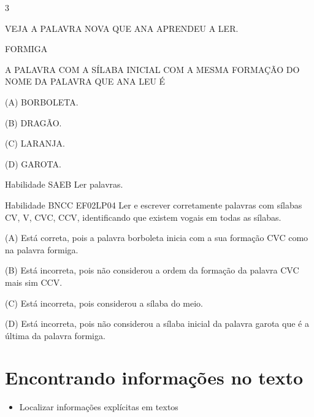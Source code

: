 {{\num{3}

VEJA A PALAVRA NOVA QUE ANA APRENDEU A LER.

FORMIGA

A PALAVRA COM A SÍLABA INICIAL COM A MESMA FORMAÇÃO DO NOME DA PALAVRA
QUE ANA LEU É

(A) BORBOLETA.

(B) DRAGÃO.

(C) LARANJA.

(D) GAROTA.

Habilidade SAEB Ler palavras.

Habilidade BNCC EF02LP04 Ler e escrever corretamente palavras com
sílabas CV, V, CVC, CCV, identificando que existem vogais em todas as
sílabas.

(A) Está correta, pois a palavra borboleta inicia com a sua formação CVC
como na palavra formiga.

(B) Está incorreta, pois não considerou a ordem da formação da palavra
CVC mais sim CCV.

(C) Está incorreta, pois considerou a sílaba do meio.

(D) Está incorreta, pois não considerou a sílaba inicial da palavra
garota que é a última da palavra formiga.

\chapter{Encontrando informações no texto}



\begin{itemize}
	\item Localizar informações explícitas em textos
\end{itemize}

}}
